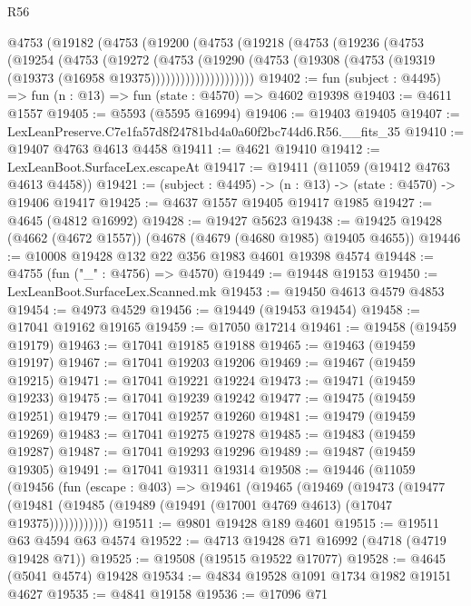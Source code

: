 \begin{lexlean}{R56}
\begin{coremodule}
      @4753
        (@19182
          (@4753
            (@19200
              (@4753
                (@19218
                  (@4753
                    (@19236
                      (@4753
                        (@19254
                          (@4753
                            (@19272
                              (@4753
                                (@19290
                                  (@4753
                                    (@19308
                                      (@4753 (@19319 (@19373 (@16958 @19375)))))))))))))))))))))
@19402 := fun (subject : @4495) => fun (n : @13) => fun (state : @4570) => @4602 @19398
@19403 := @4611 @1557
@19405 := @5593 (@5595 @16994)
@19406 := @19403 @19405
@19407 := LexLeanPreserve.C7e1fa57d8f24781bd4a0a60f2bc744d6.R56.__fits_35
@19410 := @19407 @4763 @4613 @4458
@19411 := @4621 @19410
@19412 := LexLeanBoot.SurfaceLex.escapeAt
@19417 := @19411 (@11059 (@19412 @4763 @4613 @4458))
@19421 := (subject : @4495) -> (n : @13) -> (state : @4570) -> @19406 @19417
@19425 := @4637 @1557 @19405 @19417 @1985
@19427 := @4645 (@4812 @16992)
@19428 := @19427 @5623
@19438 := @19425 @19428 (@4662 (@4672 @1557)) (@4678 (@4679 (@4680 @1985) @19405 @4655))
@19446 := @10008 @19428 @132 @22 @356 @1983 @4601 @19398 @4574
@19448 := @4755 (fun ("_" : @4756) => @4570)
@19449 := @19448 @19153
@19450 := LexLeanBoot.SurfaceLex.Scanned.mk
@19453 := @19450 @4613 @4579 @4853
@19454 := @4973 @4529
@19456 := @19449 (@19453 @19454)
@19458 := @17041 @19162 @19165
@19459 := @17050 @17214
@19461 := @19458 (@19459 @19179)
@19463 := @17041 @19185 @19188
@19465 := @19463 (@19459 @19197)
@19467 := @17041 @19203 @19206
@19469 := @19467 (@19459 @19215)
@19471 := @17041 @19221 @19224
@19473 := @19471 (@19459 @19233)
@19475 := @17041 @19239 @19242
@19477 := @19475 (@19459 @19251)
@19479 := @17041 @19257 @19260
@19481 := @19479 (@19459 @19269)
@19483 := @17041 @19275 @19278
@19485 := @19483 (@19459 @19287)
@19487 := @17041 @19293 @19296
@19489 := @19487 (@19459 @19305)
@19491 := @17041 @19311 @19314
@19508 := @19446
    (@11059
      (@19456
        (fun (escape : @403) =>
        @19461
          (@19465
            (@19469
              (@19473
                (@19477
                  (@19481 (@19485 (@19489 (@19491 (@17001 @4769 @4613) (@17047 @19375))))))))))))
@19511 := @9801 @19428 @189 @4601
@19515 := @19511 @63 @4594 @63 @4574
@19522 := @4713 @19428 @71 @16992 (@4718 (@4719 @19428 @71))
@19525 := @19508 (@19515 @19522 @17077)
@19528 := @4645 (@5041 @4574) @19428
@19534 := @4834 @19528 @1091 @1734 @1982 @19151 @4627
@19535 := @4841 @19158
@19536 := @17096 @71

\end{coremodule}
\end{lexlean}
